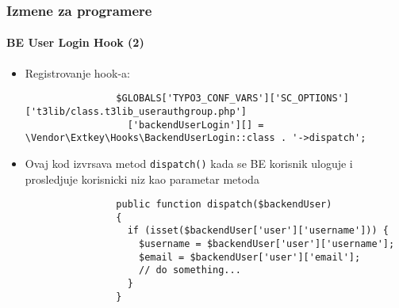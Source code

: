 \begin{frame}[fragile]
	\frametitle{Izmene za programere}
	\framesubtitle{BE User Login Hook (2)}

	\lstset{basicstyle=\tiny\ttfamily}

	\begin{itemize}
		\item Registrovanje hook-a:

			\begin{lstlisting}
				$GLOBALS['TYPO3_CONF_VARS']['SC_OPTIONS']['t3lib/class.t3lib_userauthgroup.php']
				  ['backendUserLogin'][] = \Vendor\Extkey\Hooks\BackendUserLogin::class . '->dispatch';
			\end{lstlisting}

		\item Ovaj kod izvrsava metod \texttt{dispatch()} kada se BE korisnik uloguje
			i prosledjuje korisnicki niz kao parametar metoda

			\begin{lstlisting}
				public function dispatch($backendUser)
				{
				  if (isset($backendUser['user']['username'])) {
				    $username = $backendUser['user']['username'];
				    $email = $backendUser['user']['email'];
				    // do something...
				  }
				}
			\end{lstlisting}

	\end{itemize}

\end{frame}

